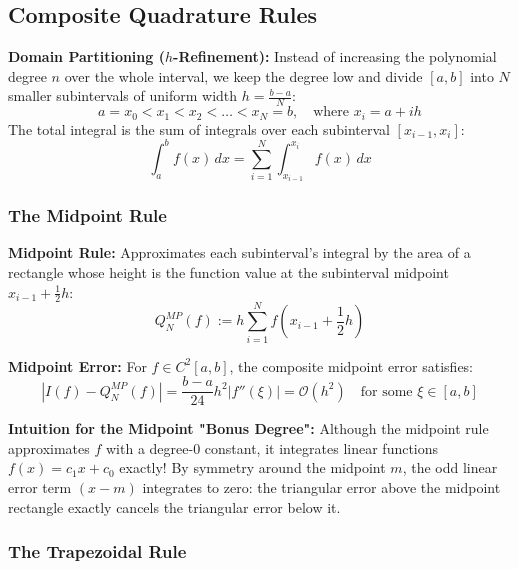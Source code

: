 \subsection{Composite Quadrature Rules}

\begin{definition}
    \textbf{Domain Partitioning ($h$-Refinement):} Instead of increasing the polynomial degree $n$ over the whole interval, we keep the degree low and divide $[a,b]$ into $N$ smaller subintervals of uniform width $h = \frac{b-a}{N}$:
    $$a = x_0 < x_1 < x_2 < \dots < x_N = b, \quad \text{where } x_i = a + i h$$
    The total integral is the sum of integrals over each subinterval $[x_{i-1}, x_i]$:
    $$\int_a^b f(x) \, dx = \sum_{i=1}^N \int_{x_{i-1}}^{x_i} f(x) \, dx$$
\end{definition}

\subsubsection{The Midpoint Rule}

\begin{definition}
    \textbf{Midpoint Rule:} Approximates each subinterval's integral by the area of a rectangle whose height is the function value at the subinterval midpoint $x_{i-1} + \frac{1}{2}h$:
    $$Q_N^{MP}(f) := h \sum_{i=1}^N f\left(x_{i-1} + \frac{1}{2}h\right)$$
\end{definition}

\begin{theorem}
    \textbf{Midpoint Error:} For $f \in C^2[a,b]$, the composite midpoint error satisfies:
    $$|I(f) - Q_N^{MP}(f)| = \frac{b-a}{24} h^2 |f''(\xi)| = \mathcal{O}(h^2) \quad \text{for some } \xi \in [a,b]$$
\end{theorem}

\begin{remark}
    \textbf{Intuition for the Midpoint "Bonus Degree":} Although the midpoint rule approximates $f$ with a degree-0 constant, it integrates linear functions $f(x) = c_1 x + c_0$ exactly! By symmetry around the midpoint $m$, the odd linear error term $(x-m)$ integrates to zero: the triangular error above the midpoint rectangle exactly cancels the triangular error below it.
\end{remark}

\subsubsection{The Trapezoidal Rule}

